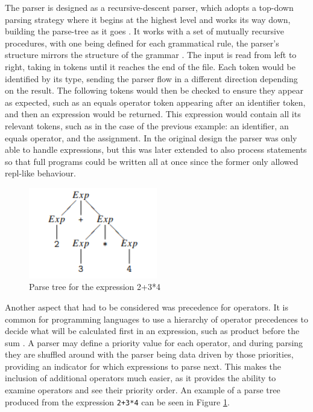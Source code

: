 \documentclass[
]{report}
\begin{document}
The parser is designed as a \gls{recursive-descent parser}, which adopts a
top-down \gls{parsing} strategy where it begins at the highest level and works
its way down, building the \gls{parse-tree} as it goes \cite{geeks-website}.
It works with a set of mutually recursive procedures, with one being defined
for each grammatical rule, the parser's structure mirrors the structure of
the grammar \cite{parsing-algorithms}. The input is read from left to right,
taking in \glspl{token} until it reaches the end of the file. Each \gls{token}
would be identified by its type, sending the parser flow in a different direction
depending on the result. The following \glspl{token} would then be checked to
ensure they appear as expected, such as an equals operator \gls{token} appearing
after an \gls{identifier} \gls{token}, and then an \gls{expression} would be returned.
This \gls{expression} would contain all its relevant \glspl{token}, such as in
the case of the previous example: an \gls{identifier}, an equals operator, and
the assignment. In the original design the parser was only able to handle \glspl{expression},
but this was later extended to also process \glspl{statement} so that full programs could be
written all at once since the former only allowed \acrshort{repl}-like behaviour.

\begin{figure}
	\centering
	\includegraphics[width=0.5\textwidth]{operator-precedence}
	\caption{Parse tree for the expression 2+3*4 \cite{compiler-design-book}}
	\label{fig:operator-precedence}
\end{figure}

Another aspect that had to be considered was precedence for operators.
It is common for programming languages to use a hierarchy of operator precedences
to decide what will be calculated first in an expression, such as product before
the sum \cite{compiler-design-book}. A parser may define a priority value for
each operator, and during \gls{parsing} they are shuffled around with the parser
being data driven by those priorities, providing an indicator for which \glspl{expression}
to parse next. This makes the inclusion of additional operators much easier, as it
provides the ability to examine operators and see their priority order. An example
of a parse tree produced from the expression \texttt{2+3*4} can be seen in Figure \ref{fig:operator-precedence}.
\end{document}
